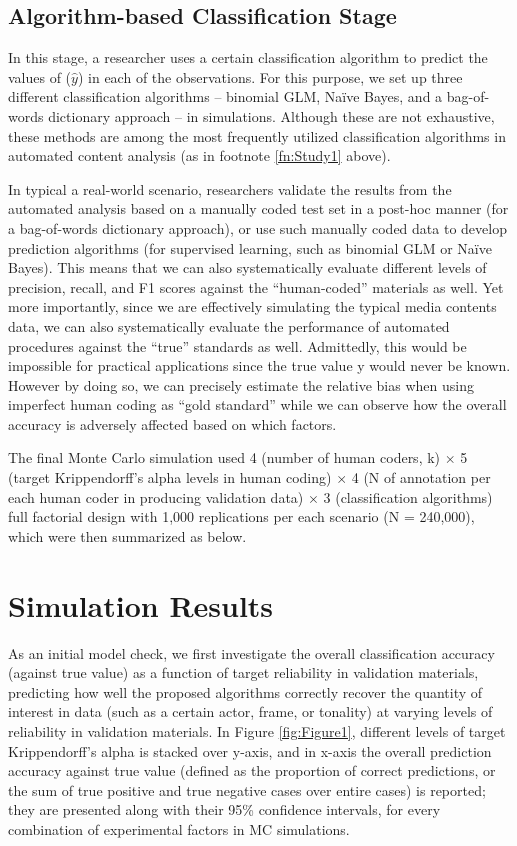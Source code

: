 \documentclass[man, floatsintext, 12pt, a4paper, noextraspace]{apa6}
\begin{document}
    \subsection{Algorithm-based Classification Stage}
    
    In this stage, a researcher uses a certain classification algorithm to predict the values of ($\hat{y}$) in each of the observations. For this purpose, we set up three different classification algorithms – binomial GLM, Naïve Bayes, and a bag-of-words dictionary approach -- in simulations. Although these are not exhaustive, these methods are among the most frequently utilized classification algorithms in automated content analysis (as in footnote \ref{fn:Study1} above). 
    
    In typical a real-world scenario, researchers validate the results from the automated analysis based on a manually coded test set in a post-hoc manner (for a bag-of-words dictionary approach), or use such manually coded data to develop prediction algorithms (for supervised learning, such as binomial GLM or Naïve Bayes). This means that we can also systematically evaluate different levels of precision, recall, and F1 scores against the \enquote{human-coded} materials as well. Yet more importantly, since we are effectively simulating the typical media contents data, we can also systematically evaluate the performance of automated procedures against the \enquote{true} standards as well. Admittedly, this would be impossible for practical applications since the true value y would never be known. However by doing so, we can precisely estimate the relative bias when using imperfect human coding as \enquote{gold standard} while we can observe how the overall accuracy is adversely affected based on which factors. 
    
    The final Monte Carlo simulation used 4 (number of human coders, k) $\times$ 5 (target Krippendorff's alpha levels in human coding) $\times$ 4 (N of annotation per each human coder in producing validation data) $\times$ 3 (classification algorithms) full factorial design with 1,000 replications per each scenario (N = 240,000), which were then summarized as below.
    
\section{Simulation Results}

    As an initial model check, we first investigate the overall classification accuracy (against true value) as a function of target reliability in validation materials, predicting how well the proposed algorithms correctly recover the quantity of interest in data (such as a certain actor, frame, or tonality) at varying levels of reliability in validation materials. In Figure \ref{fig:Figure1}, different levels of target Krippendorff's alpha is stacked over y-axis, and in x-axis the overall prediction accuracy against true value (defined as the proportion of correct predictions, or the sum of true positive and true negative cases over entire cases) is reported; they are presented along with their 95\% confidence intervals, for every combination of experimental factors in MC simulations.
\end{document}

